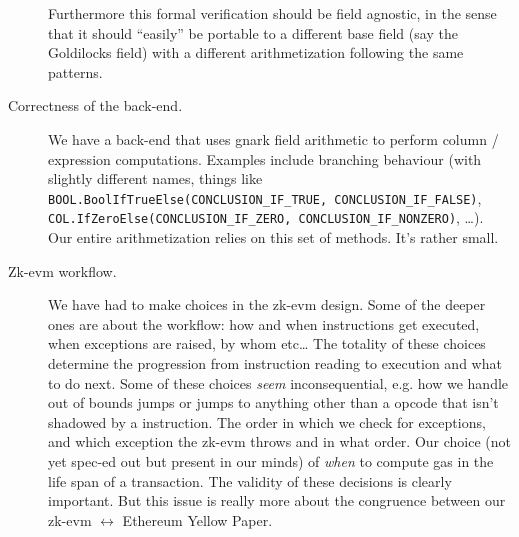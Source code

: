 \documentclass{article}
\begin{document}
\begin{description}
	Furthermore this formal verification should be field agnostic, in the sense that it should ``easily'' be portable to a different base field (say the Goldilocks field) with a different arithmetization following the same patterns.
	\item[Correctness of the back-end.] We have a back-end that uses gnark field arithmetic to perform column / expression computations. Examples include branching behaviour (with slightly different names, things like \texttt{BOOL.BoolIfTrueElse(CONCLUSION\_IF\_TRUE, CONCLUSION\_IF\_FALSE)}, \texttt{COL.IfZeroElse(CONCLUSION\_IF\_ZERO, CONCLUSION\_IF\_NONZERO)}, \dots{}). Our entire arithmetization relies on this set of methods. It's rather small.
	\item[Zk-evm workflow.] We have had to make choices in the zk-evm design. Some of the deeper ones are about the workflow: how and when instructions get executed, when exceptions are raised, by whom etc\dots{} The totality of these choices determine the progression from instruction reading to execution and what to do next. Some of these choices \emph{seem} inconsequential, e.g. how we handle out of bounds jumps or jumps to anything other than a  opcode that isn't shadowed by a  instruction. The order in which we check for exceptions, and which exception the zk-evm throws and in what order. Our choice (not yet spec-ed out but present in our minds) of \emph{when} to compute gas in the life span of a transaction. The validity of these decisions is clearly important. But this issue is really more about the congruence between our zk-evm $\longleftrightarrow$ Ethereum Yellow Paper.
\end{description}
\end{document}
